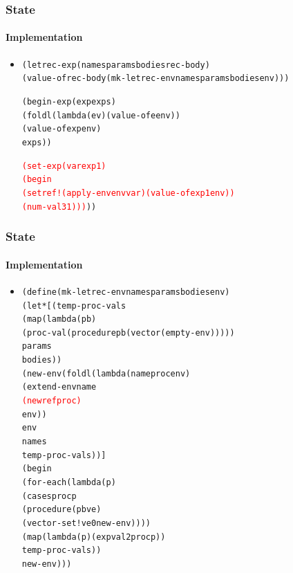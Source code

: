 \documentclass{beamer}
\begin{document}
\begin{frame}[fragile]
\frametitle{State}
\framesubtitle{Implementation}
\begin{scriptsize}
\begin{itemize}
\item<1->
\begin{alltt}
    (letrec-exp (names params bodies rec-body)
      (value-of rec-body (mk-letrec-env names params bodies env)))

    (begin-exp (exp exps)
      (foldl (lambda (e v) (value-of e env))
             (value-of exp env)
             exps))

    \textcolor{red}{(set-exp (var exp1)
             (begin
               (setref! (apply-env env var) (value-of exp1 env))
               (num-val 31)))}))
\end{alltt}

\end{itemize}
\end{scriptsize}
\end{frame}

\begin{frame}[fragile]
\frametitle{State}
\framesubtitle{Implementation}
\begin{scriptsize}
\begin{itemize}
\item<1->
\begin{alltt}
(define (mk-letrec-env names params bodies env)
  (let* [(temp-proc-vals
           (map (lambda (p b)
                  (proc-val (procedure p b (vector (empty-env)))))
                params
                bodies))
         (new-env (foldl (lambda (name proc env)
                           (extend-env name
                                       \textcolor{red}{(newref proc)}
                                       env))
                         env
                         names
                         temp-proc-vals))]
    (begin
      (for-each (lambda (p)
                  (cases proc p
                    (procedure (p b ve)
                               (vector-set! ve 0 new-env))))
                (map (lambda (p) (expval2proc p))
                     temp-proc-vals))
      new-env)))
\end{alltt}

\end{itemize}
\end{scriptsize}
\end{frame}
\end{document}
